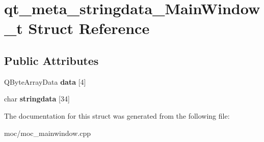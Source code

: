 \hypertarget{structqt__meta__stringdata___main_window__t}{\section{qt\-\_\-meta\-\_\-stringdata\-\_\-\-Main\-Window\-\_\-t Struct Reference}
\label{structqt__meta__stringdata___main_window__t}
}
\subsection*{Public Attributes}
\begin{DoxyCompactItemize}
\item 
\hypertarget{structqt__meta__stringdata___main_window__t_a332d7fa058028f7613b5ba68abb5a7fe}{Q\-Byte\-Array\-Data {\bfseries data} \mbox{[}4\mbox{]}}\label{structqt__meta__stringdata___main_window__t_a332d7fa058028f7613b5ba68abb5a7fe}

\item 
\hypertarget{structqt__meta__stringdata___main_window__t_a158d64a29d7183a8c00785b130830720}{char {\bfseries stringdata} \mbox{[}34\mbox{]}}\label{structqt__meta__stringdata___main_window__t_a158d64a29d7183a8c00785b130830720}

\end{DoxyCompactItemize}


The documentation for this struct was generated from the following file\-:\begin{DoxyCompactItemize}
\item 
moc/moc\-\_\-mainwindow.\-cpp\end{DoxyCompactItemize}
